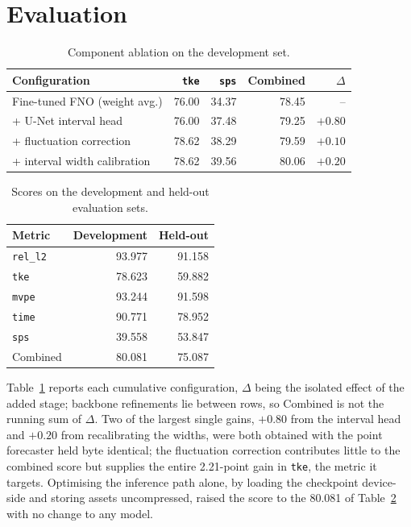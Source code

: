 \documentclass[conference,10pt]{IEEEtran}
\begin{document}
\section{Evaluation}

\begin{table}[t]
\caption{Component ablation on the development set.}
\label{tab:ablation}
\centering\small
\begin{tabular}{@{}lrrrr@{}}
\toprule
Configuration & \texttt{tke} & \texttt{sps} & Combined & $\Delta$\\
\midrule
Fine-tuned FNO (weight avg.) & 76.00 & 34.37 & 78.45 & --\\
\hspace{0.55em}+ U-Net interval head & 76.00 & 37.48 & 79.25 & $+0.80$\\
\hspace{0.55em}+ fluctuation correction & 78.62 & 38.29 & 79.59 & $+0.10$\\
\hspace{0.55em}+ interval width calibration & 78.62 & 39.56 & 80.06 & $+0.20$\\
\bottomrule
\end{tabular}
\end{table}

\begin{table}[t]
\caption{Scores on the development and held-out evaluation sets.}
\label{tab:results}
\centering\small
\begin{tabular}{lrr}
\toprule
Metric & Development & Held-out\\
\midrule
\texttt{rel\_l2} & 93.977 & 91.158\\
\texttt{tke} & 78.623 & 59.882\\
\texttt{mvpe} & 93.244 & 91.598\\
\texttt{time} & 90.771 & 78.952\\
\texttt{sps} & 39.558 & 53.847\\
\midrule
Combined & 80.081 & 75.087\\
\bottomrule
\end{tabular}
\end{table}

Table~\ref{tab:ablation} reports each cumulative configuration, $\Delta$ being the isolated effect of the added stage; backbone refinements lie between rows, so Combined is not the running sum of $\Delta$. Two of the largest single gains, $+0.80$ from the interval head and $+0.20$ from recalibrating the widths, were both obtained with the point forecaster held byte identical; the fluctuation correction contributes little to the combined score but supplies the entire 2.21-point gain in \texttt{tke}, the metric it targets. Optimising the inference path alone, by loading the checkpoint device-side and storing assets uncompressed, raised the score to the 80.081 of Table~\ref{tab:results} with no change to any model.
\end{document}
